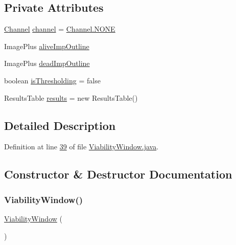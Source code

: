 \subsection*{Private Attributes}
\begin{DoxyCompactItemize}
\item 
\hyperlink{enumgui_1_1_viability_window_1_1_channel}{Channel} \hyperlink{classgui_1_1_viability_window_aeb170129564baee9da9b1f064753420c}{channel} = \hyperlink{enumgui_1_1_viability_window_1_1_channel_a899caa602e4fff675b17cdbab33607ec}{Channel.\+N\+O\+NE}
\item 
Image\+Plus \hyperlink{classgui_1_1_viability_window_ada3e873f306d92d8af66896d5395e2c4}{alive\+Imp\+Outline}
\item 
Image\+Plus \hyperlink{classgui_1_1_viability_window_ae10626a8a263ac741e63d226c8375114}{dead\+Imp\+Outline}
\item 
boolean \hyperlink{classgui_1_1_viability_window_a3c3ae31647b93ff77785eb37236fbcb7}{is\+Thresholding} = false
\item 
Results\+Table \hyperlink{classgui_1_1_viability_window_a15c93e0c8f542fcf3b3505943a26489d}{results} = new Results\+Table()
\end{DoxyCompactItemize}


\subsection{Detailed Description}


Definition at line \hyperlink{_viability_window_8java_source_l00039}{39} of file \hyperlink{_viability_window_8java_source}{Viability\+Window.\+java}.



\subsection{Constructor \& Destructor Documentation}
\hypertarget{classgui_1_1_viability_window_a9352db24ec12b97781c0ca61f2938a00}{}\label{classgui_1_1_viability_window_a9352db24ec12b97781c0ca61f2938a00} 
\subsubsection{\texorpdfstring{Viability\+Window()}{ViabilityWindow()}}
{\footnotesize\ttfamily \hyperlink{classgui_1_1_viability_window}{Viability\+Window} (\begin{DoxyParamCaption}{ }\end{DoxyParamCaption})}


